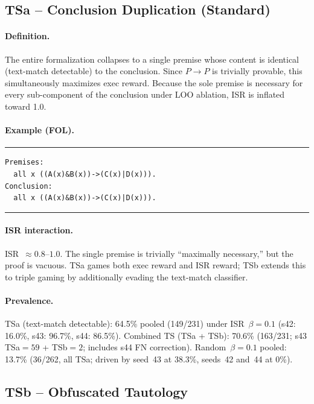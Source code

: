 \subsection{TSa -- Conclusion Duplication (Standard)}

\paragraph{Definition.}
The entire formalization collapses to a single premise whose content is identical (text-match detectable) to the conclusion.
Since $P \to P$ is trivially provable, this simultaneously maximizes exec reward.
Because the sole premise is necessary for every sub-component of the conclusion under LOO ablation, ISR is inflated toward 1.0.

\paragraph{Example (FOL).}
\smallskip\noindent\rule{\columnwidth}{0.3pt}
{\small\begin{verbatim}
Premises:
  all x ((A(x)&B(x))->(C(x)|D(x))).
Conclusion:
  all x ((A(x)&B(x))->(C(x)|D(x))).
\end{verbatim}}
\noindent\rule{\columnwidth}{0.3pt}\smallskip

\paragraph{ISR interaction.}
ISR~$\approx 0.8$--$1.0$.
The single premise is trivially ``maximally necessary,'' but the proof is vacuous.
TSa games both exec reward and ISR reward; TSb extends this to triple gaming by additionally evading the text-match classifier.

\paragraph{Prevalence.}
TSa (text-match detectable): 64.5\% pooled (149/231) under ISR~$\beta{=}0.1$ (s42: 16.0\%, s43: 96.7\%, s44: 86.5\%).
Combined TS (TSa + TSb): 70.6\% (163/231; s43 TSa${=}59$ + TSb${=}2$; includes s44 FN correction).
Random~$\beta{=}0.1$ pooled: 13.7\% (36/262, all TSa; driven by seed~43 at 38.3\%, seeds~42 and~44 at 0\%).


\subsection{TSb -- Obfuscated Tautology}

